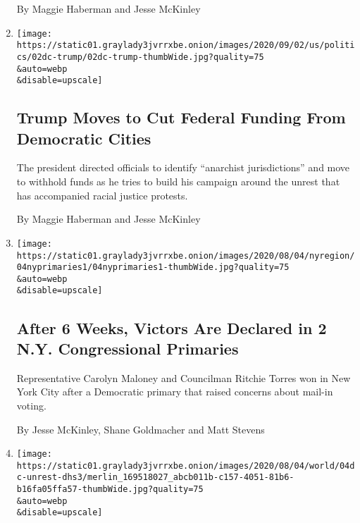 \begin{enumerate}
  By Maggie Haberman and Jesse McKinley
\item
  \href{/2020/09/02/us/politics/trump-funding-cities.html}{}

  \texttt{[image: https://static01.graylady3jvrrxbe.onion/images/2020/09/02/us/politics/02dc-trump/02dc-trump-thumbWide.jpg?quality=75\\\&auto=webp\\\&disable=upscale]}

  \hypertarget{trump-moves-to-cut-federal-funding-from-democratic-cities-1}{%
  \subsection{Trump Moves to Cut Federal Funding From Democratic
  Cities}\label{trump-moves-to-cut-federal-funding-from-democratic-cities-1}}

  The president directed officials to identify ``anarchist
  jurisdictions'' and move to withhold funds as he tries to build his
  campaign around the unrest that has accompanied racial justice
  protests.

  By Maggie Haberman and Jesse McKinley
\item
  \href{/2020/08/04/nyregion/maloney-torres-ny-congressional-races.html}{}

  \texttt{[image: https://static01.graylady3jvrrxbe.onion/images/2020/08/04/nyregion/04nyprimaries1/04nyprimaries1-thumbWide.jpg?quality=75\\\&auto=webp\\\&disable=upscale]}

  \hypertarget{after-6-weeks-victors-are-declared-in-2-ny-congressional-primaries}{%
  \subsection{After 6 Weeks, Victors Are Declared in 2 N.Y.
  Congressional
  Primaries}\label{after-6-weeks-victors-are-declared-in-2-ny-congressional-primaries}}

  Representative Carolyn Maloney and Councilman Ritchie Torres won in
  New York City after a Democratic primary that raised concerns about
  mail-in voting.

  By Jesse McKinley, Shane Goldmacher and Matt Stevens
\item
  \href{/2020/08/04/us/politics/trump-homeland-security.html}{}

  \texttt{[image: https://static01.graylady3jvrrxbe.onion/images/2020/08/04/world/04dc-unrest-dhs3/merlin\_169518027\_abcb011b-c157-4051-81b6-b16fa05ffa57-thumbWide.jpg?quality=75\\\&auto=webp\\\&disable=upscale]}

  \hypertarget{meet-the-official-accused-of-helping-trump-politicize-homeland-security}{%
}
\end{enumerate}
